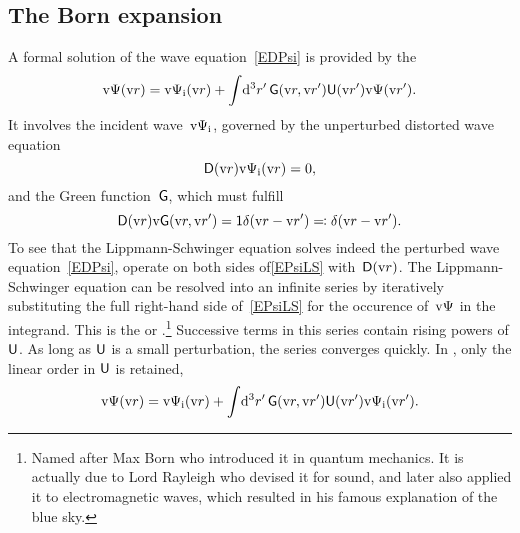 \subsection{The Born expansion}\label{SBornExpans}

A formal solution of the wave equation~\cref{EDPsi} is provided
by the 
%
\begin{equation}\label{EPsiLS}
  \text{v}\Psi(\text{v}{r})
  = \text{v}\Psi_{\text{i}}(\text{v}{r})
  + \int\!\mathrm d^3r'\, \mathsf{G}(\text{v}{r},\text{v}{r}') \mathsf{U}(\text{v}{r}')\text{v}\Psi(\text{v}{r}').
\end{equation}
It involves the incident wave~$\text{v}\Psi_{\text{i}}$, governed by the unperturbed distorted wave equation
%
%
%
%
%
%
\begin{equation}\label{EDPsii}
  \mathsf{D}(\text{v}{r})\text{v}\Psi_{\text{i}}(\text{v}{r}) = 0,
\end{equation}
and the Green function~$\mathsf{G}$,
%
%
which must fulfill
\begin{equation}\label{EGREEN}
  \mathsf{D}(\text{v}{r})\text{v}\mathsf{G}(\text{v}{r},\text{v}{r}') = \mathsf{1} \delta(\text{v}{r}-\text{v}{r}') \eqqcolon \mathsf{\delta}(\text{v}{r}-\text{v}{r}').
\end{equation}
To see that the Lippmann-Schwinger equation solves indeed the perturbed wave equation~\cref{EDPsi},
operate on both sides of\cref{EPsiLS} with~$\mathsf{D}(\text{v}{r})$.
The Lippmann-Schwinger equation can be resolved into an infinite series
by iteratively substituting the full right-hand side of~\cref{EPsiLS}
for the occurence of~$\text{v}\Psi$ in the integrand.
%
%
This is the  or .\footnote
{Named after Max Born who introduced it in quantum mechanics.
It is actually due to Lord Rayleigh who devised it for sound,
and later also applied it to electromagnetic waves,
which resulted in his famous explanation of the blue sky.}
Successive terms in this series contain rising powers of $\mathsf{U}$.
As long as $\mathsf{U}$ is a small perturbation, the series converges quickly.
In ,
%
only the linear order in $\mathsf{U}$ is retained,
\begin{equation}\label{EBorn}
  \text{v}\Psi(\text{v}{r})
  = \text{v}\Psi_{\text{i}}(\text{v}{r})
  + \int\!\mathrm d^3r'\, \mathsf{G}(\text{v}{r},\text{v}{r}') \mathsf{U}(\text{v}{r}')\text{v}\Psi_{\text{i}}(\text{v}{r}').
\end{equation}
